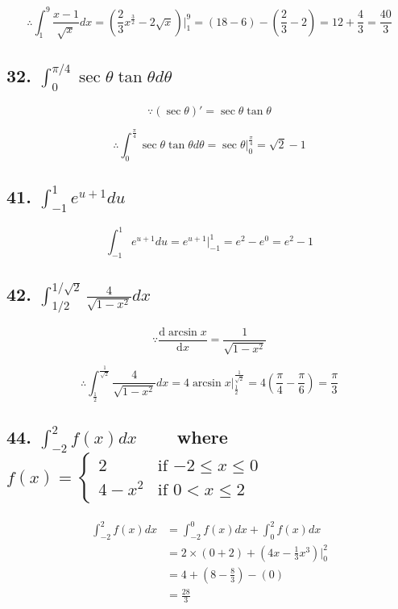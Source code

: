 \documentclass{article}
\begin{document}
    $$\therefore \int_1^9\frac{x - 1}{\sqrt x}dx = (\frac 2 3 x^{\frac 3 2} - 2\sqrt x) \biggl | _1^9 = (18 - 6) - (\frac 2 3 - 2) = 12 + \frac 4 3 = \frac{40}{3}$$

    \subsection*{32. $\int_{0}^{\pi / 4} \sec \theta \tan \theta d\theta$}

    $$\because (\sec \theta)' = \sec \theta \tan \theta$$

    $$\therefore \int_{0}^{\frac \pi 4} \sec \theta \tan \theta d\theta = \sec \theta \biggl |_0^{\frac \pi 4} = \sqrt 2 - 1$$

    \subsection*{41. $\int_{-1}^1 e^{u + 1}du$}

    $$\int_{-1}^1e^{u + 1}du = e^{u + 1} \biggl |_{-1}^1 = e^2 - e^0 = e^2 - 1$$

    \subsection*{42. $\int_{1 / 2}^{1 / \sqrt 2} \frac{4}{\sqrt{1 - x^2}} dx$}

    $$\because \frac{\mathrm d\arcsin x}{\mathrm dx} = \frac{1}{\sqrt{1 - x^2}}$$

    $$\therefore \int_{\frac 1 2}^{\frac{1}{\sqrt 2}} \frac{4}{\sqrt{1 - x^2}} dx = 4\arcsin x \biggl | _{\frac 1 2}^{\frac{1}{\sqrt 2}} = 4(\frac \pi 4 - \frac \pi 6) = \frac \pi 3$$

    \subsection*{44. $\int_{-2}^2f(x)dx \qquad$ where $f(x) = \left\{ \begin{array}{ll}
        2 & \textrm{if $-2 \leq x \leq 0$} \\
        4 - x^2 & \textrm{if $0 < x \leq 2$}
    \end{array} \right.$}

    $$\begin{aligned}
        \int_{-2}^2f(x)dx &= \int_{-2}^0f(x)dx + \int_0^2f(x)dx \\
        &= 2 \times (0 + 2) + (4x - \frac 1 3 x^3) \biggl | _0^2 \\
        &= 4 + (8 - \frac 8 3 ) - (0) \\
        &= \frac{28}{3}
    \end{aligned}$$
\end{document}
